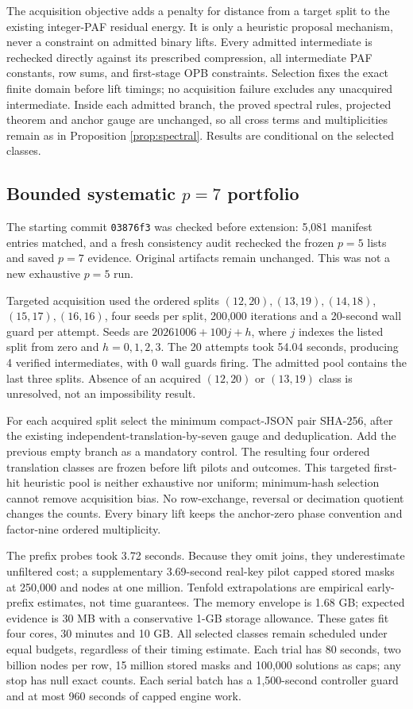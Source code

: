 \documentclass[11pt]{article}
\begin{document}
The acquisition objective adds a penalty for distance from a target split
to the existing integer-PAF residual energy. It is only a heuristic proposal
mechanism, never a constraint on admitted binary lifts. Every admitted
intermediate is rechecked directly against its prescribed compression,
all intermediate PAF constants, row sums, and first-stage OPB constraints.
Selection fixes the exact finite domain before lift timings; no acquisition
failure excludes any unacquired intermediate. Inside each admitted branch,
the proved spectral rules, projected theorem and anchor gauge are unchanged,
so all cross terms and multiplicities remain as in Proposition
\ref{prop:spectral}. Results are conditional on the selected classes.

\subsection{Bounded systematic $p=7$ portfolio}
The starting commit \texttt{03876f3} was checked before extension:
5,081 manifest entries matched, and a fresh consistency audit rechecked
the frozen $p=5$ lists and saved $p=7$ evidence. Original artifacts remain
unchanged. This was not a new exhaustive $p=5$ run.

Targeted acquisition used the ordered splits $(12,20),(13,19),(14,18)$,
$(15,17),(16,16)$, four seeds per split, 200,000 iterations and a 20-second
wall guard per attempt. Seeds are $20261006+100j+h$, where $j$ indexes the
listed split from zero and $h=0,1,2,3$. The 20 attempts
took 54.04 seconds, producing 4
verified intermediates, with 0 wall guards firing. The admitted
pool contains the last three splits. Absence of an acquired $(12,20)$ or
$(13,19)$ class is unresolved, not an impossibility result.

For each acquired split select the minimum compact-JSON pair SHA-256,
after the existing independent-translation-by-seven gauge and deduplication.
Add the previous empty branch as a mandatory control. The resulting four
ordered translation classes are frozen before lift pilots and outcomes.
This targeted first-hit heuristic pool is neither exhaustive nor uniform;
minimum-hash selection cannot remove acquisition bias. No row-exchange,
reversal or decimation quotient changes the counts. Every binary lift keeps
the anchor-zero phase convention and factor-nine ordered multiplicity.

The prefix probes took 3.72 seconds.
Because they omit joins, they underestimate unfiltered cost; a supplementary
3.69-second real-key pilot capped
stored masks at 250,000 and nodes at one million. Tenfold extrapolations
are empirical early-prefix estimates, not time guarantees. The memory
envelope is 1.68 GB; expected evidence is 30 MB with a conservative 1-GB
storage allowance. These gates fit four cores, 30 minutes and 10 GB.
All selected classes remain scheduled under equal budgets, regardless of
their timing estimate. Each trial has 80 seconds, two billion nodes per row,
15 million stored masks and 100,000 solutions as caps; any stop has null
exact counts. Each serial batch has a 1,500-second controller guard and at
most 960 seconds of capped engine work.
\end{document}
